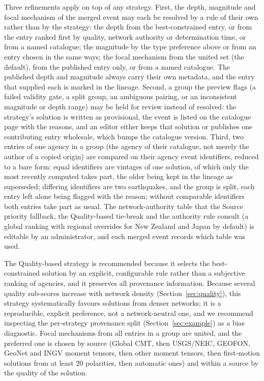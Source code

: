 \documentclass[12pt]{article}
\begin{document}
Three refinements apply on top of any strategy.  First, the depth, magnitude
and focal mechanism of the merged event may each be resolved by a rule of their
own rather than by the strategy: the depth from the best-constrained entry, or
from the entry ranked first by quality, network authority or determination
time, or from a named catalogue; the magnitude by the type preference above or
from an entry chosen in the same ways; the focal mechanism from the united set
(the default), from the published entry only, or from a named catalogue.  The
published depth and magnitude always carry their own metadata, and the entry
that supplied each is marked in the lineage.  Second, a group the preview flags
(a failed validity gate, a split group, an ambiguous pairing, or an inconsistent
magnitude or depth range) may be held for review instead of resolved: the
strategy's solution is written as provisional, the event is listed on the
catalogue page with the reasons, and an editor either keeps that solution or
publishes one contributing entry wholesale, which bumps the catalogue version.
Third, two entries of one agency in a group (the agency of their catalogue, not
merely the author of a copied origin) are compared on their agency event
identifiers, reduced to a bare form: equal identifiers are vintages of one
solution, of which only the most recently computed takes part, the older being
kept in the lineage as superseded; differing identifiers are two earthquakes,
and the group is split, each entry left alone being flagged with the reason;
without comparable identifiers both entries take part as usual.  The network-authority table that the Source priority fallback,
the Quality-based tie-break and the authority rule consult (a global ranking
with regional overrides for New Zealand and Japan by default) is editable by an
administrator, and each merged event records which table was used.

The Quality-based strategy is recommended because it selects the
best-constrained solution by an explicit, configurable rule rather than a
subjective ranking of agencies, and it preserves all provenance information.
Because several quality sub-scores increase with network density
(Section~\ref{sec:quality}), this strategy systematically favours solutions from
denser networks; it is a reproducible, explicit preference, not a network-neutral
one, and we recommend inspecting the per-strategy provenance split
(Section~\ref{sec:example}) as a bias diagnostic.  Focal mechanisms from all
entries in a group are united, and the preferred one is chosen by source (Global
CMT, then USGS/NEIC, GEOFON, GeoNet and INGV moment tensors, then other moment
tensors, then first-motion solutions from at least 20 polarities, then automatic
ones) and within a source by the quality of the solution.
\end{document}
